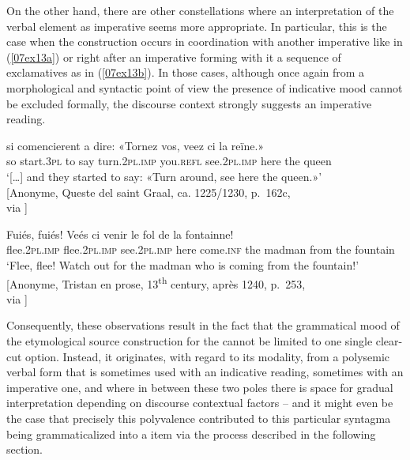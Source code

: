 \documentclass[output=paper,colorlinks,citecolor=brown]{langscibook}
\begin{document}
On the other hand, there are other constellations where an interpretation of the verbal element as imperative seems more appropriate. In particular, this is the case when the  construction occurs in coordination with another imperative like in (\ref{07ex13a}) or right after an imperative forming with it a sequence of exclamatives as in (\ref{07ex13b}). In those cases, although once again from a morphological and syntactic point of view the presence of indicative mood cannot be excluded formally, the discourse context strongly suggests an imperative reading.

\begin{exe}
	\ex
	\begin{xlist}
		\ex \label{07ex13a} \gll […] si comencierent a dire: «Tornez vos, veez ci la reïne.» \\
		[…] so start.\textsc{3pl} to say turn.\textsc{2pl.imp} you.\textsc{refl} see.\textsc{2pl.imp} here the queen \\
		\trans ‘[…] and they started to say: «Turn around, see here the queen.»’ \\
		\hfill [Anonyme, Queste del saint Graal, ca. 1225/1230, p.~162c, \\
		\hfill via \cite{bfm2022}]
		
		\ex \label{07ex13b} \gll Fuiés, fuiés! Veés ci venir le fol de la fontainne! \\
		flee.\textsc{2pl.imp} flee.\textsc{2pl.imp} see.\textsc{2pl.imp} here come.\textsc{inf} the madman from the fountain \\
		\trans ‘Flee, flee! Watch out for the madman who is coming from the fountain!’ \\
		\hfill [Anonyme, Tristan en prose, 13\textsuperscript{th} century, après 1240, p.~253, \\
		\hfill via \cite{bfm2022}]
	\end{xlist}
\end{exe}

Consequently, these observations result in the fact that the grammatical mood of the etymological source construction for the   cannot be limited to one single clear-cut option. Instead, it originates, with regard to its modality, from a polysemic verbal form that is sometimes used with an indicative reading, sometimes with an imperative one, and where in between these two poles there is space for gradual interpretation depending on discourse contextual factors -- and it might even be the case that precisely this polyvalence contributed to this particular syntagma being grammaticalized into a  item via the process described in the following section.
\end{document}
